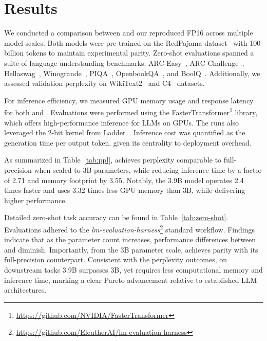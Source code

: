 \section{Results}

We conducted a comparison between  and our reproduced FP16  across multiple model scales. Both models were pre-trained on the RedPajama dataset~\cite{redpajama} with 100 billion tokens to maintain experimental parity. Zero-shot evaluations spanned a suite of language understanding benchmarks: ARC-Easy~\cite{arc}, ARC-Challenge~\cite{arc}, Hellaswag~\cite{hellaswag}, Winogrande~\cite{winoGrande}, PIQA~\cite{piqa}, OpenbookQA~\cite{openbookqa}, and BoolQ~\cite{boolq}. Additionally, we assessed validation perplexity on WikiText2~\cite{wikitext2} and C4~\cite{c4} datasets.

For inference efficiency, we measured GPU memory usage and response latency for both  and . Evaluations were performed using the FasterTransformer\footnote{\url{https://github.com/NVIDIA/FasterTransformer}} library, which offers high-performance inference for LLMs on GPUs. The  runs also leveraged the 2-bit kernel from Ladder~\cite{ladder}. Inference cost was quantified as the generation time per output token, given its centrality to deployment overhead.

As summarized in Table~\ref{tab:ppl},  achieves perplexity comparable to full-precision  when scaled to 3B parameters, while reducing inference time by a factor of 2.71 and memory footprint by 3.55. Notably, the 3.9B  model operates 2.4 times faster and uses 3.32 times less GPU memory than  3B, while delivering higher performance.

Detailed zero-shot task accuracy can be found in Table~\ref{tab:zero-shot}. Evaluations adhered to the \emph{lm-evaluation-harness}\footnote{\url{https://github.com/EleutherAI/lm-evaluation-harness}} standard workflow. Findings indicate that as the parameter count increases, performance differences between  and  diminish. Importantly, from the 3B parameter scale,  achieves parity with its full-precision counterpart. Consistent with the perplexity outcomes, on downstream tasks  3.9B surpasses  3B, yet requires less computational memory and inference time, marking a clear Pareto advancement relative to established LLM architectures.


